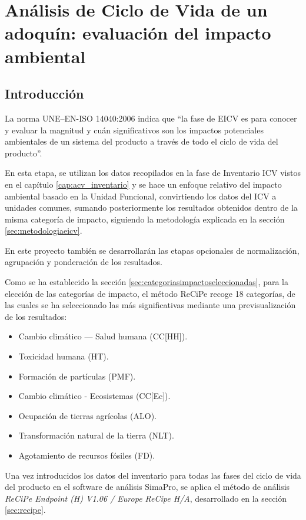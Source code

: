 \chapter{Análisis de Ciclo de Vida de un adoquín: evaluación del impacto ambiental}\label{cap:acv_evaluacion}

\section{Introducción}
La norma UNE–EN-ISO 14040:2006 \cite{iso14040} indica que ``la fase de EICV es para conocer y evaluar la magnitud y cuán significativos son los impactos potenciales ambientales de un sistema del producto a través de todo el ciclo de vida del producto''.

En esta etapa, se utilizan los datos recopilados en la fase de Inventario ICV vistos en el capítulo \ref{cap:acv_inventario} y se hace un enfoque relativo del impacto ambiental basado en la Unidad Funcional, convirtiendo los datos del ICV a unidades comunes, sumando posteriormente los resultados obtenidos dentro de la misma categoría de impacto, siguiendo la metodología explicada en la sección \ref{sec:metodologiaeicv}.

En este proyecto también se desarrollarán las etapas opcionales de normalización, agrupación y ponderación de los resultados.

Como se ha establecido la sección \ref{sec:categoriasimpactoseleccionadas}, para la elección de las categorías de impacto, el método ReCiPe recoge 18 categorías, de las cuales se ha seleccionado las más significativas mediante una previsualización de los resultados:

\begin{itemize}
  \item Cambio climático — Salud humana (CC[HH]).
  \item Toxicidad humana (HT).
  \item Formación de partículas (PMF).
  \item Cambio climático - Ecosistemas (CC[Ec]).
  \item Ocupación de tierras agrícolas (ALO).
  \item Transformación natural de la tierra (NLT).
  \item Agotamiento de recursos fósiles (FD).
\end{itemize}

Una vez introducidos los datos del inventario para todas las fases del ciclo de vida del producto en el software de análisis SimaPro, se aplica el método de análisis \textit{ReCiPe Endpoint (H) V1.06 / Europe ReCipe H/A}, desarrollado en la sección \ref{sec:recipe}.

